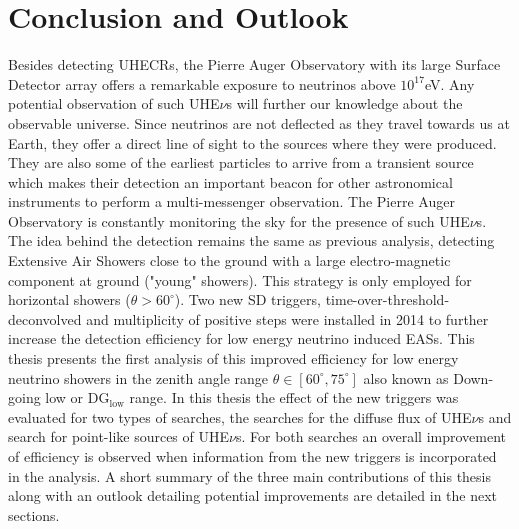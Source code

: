 
\chapter{Conclusion and Outlook}
\label{chap:conc}

Besides detecting \glspl{UHECR}, the Pierre Auger Observatory with its large Surface Detector array offers a remarkable exposure to neutrinos above $10^{17}$eV. Any potential observation of such UHE$\nu$s will further our knowledge about the observable universe. Since neutrinos are not deflected as they travel towards us at Earth, they offer a direct line of sight to the sources where they were produced. They are also some of the earliest particles to arrive from a transient source which makes their detection an important beacon for other astronomical instruments to perform a multi-messenger observation. The Pierre Auger Observatory is constantly monitoring the sky for the presence of such UHE$\nu$s. The idea behind the detection remains the same as previous analysis, detecting Extensive Air Showers close to the ground with a large electro-magnetic component at ground ("young" showers). This strategy is only employed for horizontal showers ($\theta > 60^{\circ}$). Two new SD triggers, time-over-threshold-deconvolved and multiplicity of positive steps were installed in 2014 to further increase the detection efficiency for low energy neutrino induced EASs. This thesis presents the first analysis of this improved efficiency for low energy neutrino showers in the zenith angle range $\theta \in [60^{\circ},75^\circ]$ also known as Down-going low or DG$_{\text{low}}$ range. In this thesis the effect of the new triggers was evaluated for two types of searches, the searches for the diffuse flux of UHE$\nu$s and search for point-like sources of UHE$\nu$s. For both searches an overall improvement of efficiency is observed when information from the new triggers is incorporated in the analysis. A short summary of the three main contributions of this thesis along with an outlook detailing potential improvements are detailed in the next sections. 
